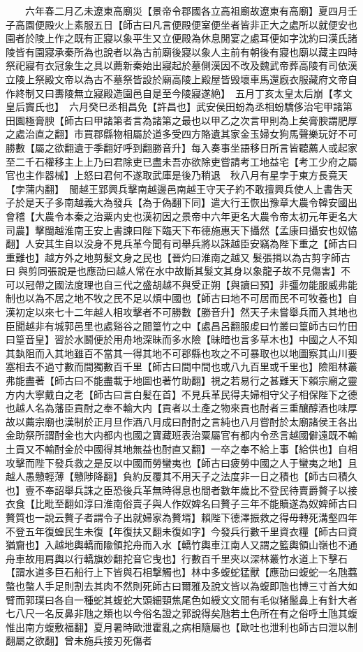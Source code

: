 　　六年春二月乙未遼東高廟災【景帝令郡國各立高祖廟故遼東有高廟】夏四月壬子高園便殿火上素服五日【師古曰凡言便殿便室便坐者皆非正大之處所以就便安也園者於陵上作之既有正寢以象平生又立便殿為休息閒宴之處耳便如字沈約曰漢氏諸陵皆有園寢承秦所為也說者以為古前廟後寢以象人主前有朝後有寢也廟以藏主四時祭祀寢有衣冠象生之具以薦新秦始出寢起於墓側漢因不改及魏武帝葬高陵有司依漢立陵上祭殿文帝以為古不墓祭皆設於廟高陵上殿屋皆毁壞車馬還廐衣服藏府文帝自作終制又曰夀陵無立寢殿造園邑自是至今陵寢遂絶】　五月丁亥太皇太后崩【孝文皇后竇氏也】　六月癸巳丞相昌免【許昌也】武安侯田蚡為丞相蚡驕侈治宅甲諸第田園極膏腴【師古曰甲諸第者言為諸第之最也以甲乙之次言甲則為上矣膏腴謂肥厚之處治直之翻】市買郡縣物相屬於道多受四方賂遺其家金玉婦女狗馬聲樂玩好不可勝數【屬之欲翻遺于季翻好呼到翻勝音升】每入奏事坐語移日所言皆聽薦人或起家至二千石權移主上上乃曰君除吏已盡未吾亦欲除吏嘗請考工地益宅【考工少府之屬官也主作器械】上怒曰君何不遂取武庫是後乃稍退　秋八月有星孛于東方長竟天【孛蒲内翻】　閩越王郢興兵擊南越邊邑南越王守天子約不敢擅興兵使人上書吿天子於是天子多南越義大為發兵【為于偽翻下同】遣大行王恢出豫章大農令韓安國出會稽【大農令本秦之治粟内史也漢初因之景帝中六年更名大農令帝太初元年更名大司農】擊閩越淮南王安上書諫曰陛下臨天下布德施惠天下攝然【孟康曰攝安也奴恊翻】人安其生自以没身不見兵革今聞有司舉兵將以誅越臣安竊為陛下重之【師古曰重難也】越方外之地剪髮文身之民也【晉灼曰淮南之越又髮張揖以為古剪字師古曰與剪同張說是也應劭曰越人常在水中故斷其髮文其身以象龍子故不見傷害】不可以冠帶之國法度理也自三代之盛胡越不與受正朔【與讀曰預】非彊勿能服威弗能制也以為不居之地不牧之民不足以煩中國也【師古曰地不可居而民不可牧養也】自漢初定以來七十二年越人相攻擊者不可勝數【勝音升】然天子未嘗舉兵而入其地也臣聞越非有城郭邑里也處谿谷之間篁竹之中【處昌呂翻服䖍曰竹叢曰篁師古曰竹田曰篁音皇】習於水鬭便於用舟地深昧而多水險【昧暗也言多草木也】中國之人不知其埶阻而入其地雖百不當其一得其地不可郡縣也攻之不可暴取也以地圖察其山川要塞相去不過寸數而間獨數百千里【師古曰間中間也或八九百里或千里也】險阻林叢弗能盡著【師古曰不能盡載于地圖也著竹助翻】視之若易行之甚難天下賴宗廟之靈方内大寧戴白之老【師古曰言白髪在首】不見兵革民得夫婦相守父子相保陛下之德也越人名為藩臣貢酎之奉不輸大内【貢者以土產之物來貢也酎者三重釀醇酒也味厚故以薦宗廟也漢制於正月旦作酒八月成曰酎酎之言純也八月嘗酎於太廟諸侯王各出金助祭所謂酎金也大内都内也國之寶藏班表治粟屬官有都内令丞言越國僻遠既不輸土貢又不輸酎金於中國得其地無益也酎直又翻】一卒之奉不給上事【給供也】自相攻擊而陛下發兵救之是反以中國而勞蠻夷也【師古曰疲勞中國之人于蠻夷之地】且越人愚戇輕薄【戇陟降翻】負約反覆其不用天子之法度非一日之積也【師古曰積久也】壹不奉詔舉兵誅之臣恐後兵革無時得息也間者數年歲比不登民待賣爵贅子以接衣食【比毗至翻如淳曰淮南俗賣子與人作奴婢名曰贅子三年不能贖遂為奴婢師古曰贅質也一說云贅子者謂令子出就婦家為贅壻】賴陛下德澤振救之得毋轉死溝壑四年不登五年復蝗民生未復【年復扶又翻未復如字】今發兵行數千里資衣糧【師古曰資猶齎也】入越地輿轎而隃領拕舟而入水【轎竹輿車江南人又謂之籃輿領山嶺也不通舟車故用肩輿以行轎旗妙翻拕音它曳也】行數百千里夾以深林叢竹水道上下擊石【謂水道多巨石船行上下皆與石相撃觸也】林中多蝮蛇猛獸【應劭曰蝮蛇一名虺蠚螫也螫人手足則割去其肉不然則死師古曰爾雅及說文皆以為蝮即虺也博三寸首大如臂而郭璞曰各自一種蛇其蝮蛇大頭細頸焦尾色如綬文文間有毛似猪鬛鼻上有針大者七八尺一名反鼻非虺之類也以今俗名證之郭說得矣虺若土色所在有之俗呼土虺其蝮惟出南方蝮敷福翻】夏月暑時歐泄霍亂之病相隨屬也【歐吐也泄利也師古曰泄以制翻屬之欲翻】曾未施兵接刃死傷者